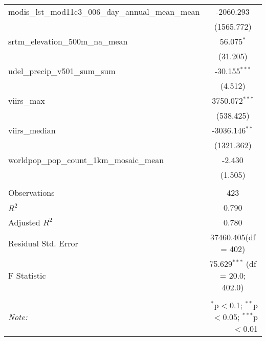 \begin{table}[!htbp]
\begin{tabular}{@{\extracolsep{5pt}}lc}
 modis_lst_mod11c3_006_day_annual_mean_mean & -2060.293$^{}$ \\
  & (1565.772) \\
 srtm_elevation_500m_na_mean & 56.075$^{*}$ \\
  & (31.205) \\
 udel_precip_v501_sum_sum & -30.155$^{***}$ \\
  & (4.512) \\
 viirs_max & 3750.072$^{***}$ \\
  & (538.425) \\
 viirs_median & -3036.146$^{**}$ \\
  & (1321.362) \\
 worldpop_pop_count_1km_mosaic_mean & -2.430$^{}$ \\
  & (1.505) \\
\hline \\[-1.8ex]
 Observations & 423 \\
 $R^2$ & 0.790 \\
 Adjusted $R^2$ & 0.780 \\
 Residual Std. Error & 37460.405(df = 402)  \\
 F Statistic & 75.629$^{***}$ (df = 20.0; 402.0) \\
\hline
\hline \\[-1.8ex]
\textit{Note:} & \multicolumn{1}{r}{$^{*}$p$<$0.1; $^{**}$p$<$0.05; $^{***}$p$<$0.01} \\
\end{tabular}
\end{table}